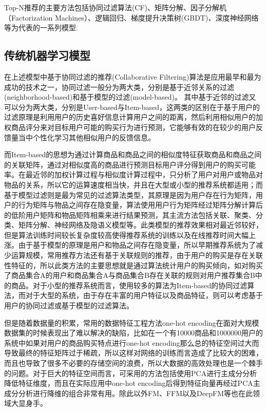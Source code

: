 Top-N推荐的主要方法包括协同过滤算法(CF)、矩阵分解、因子分解机（Factorization Machines）、逻辑回归、梯度提升决策树(GBDT)、深度神经网络等为代表的一系列模型.

\subsection{传统机器学习模型}

在上述模型中基于协同过滤的推荐(Collaborative Filtering)\cite{su2009survey}算法是应用最早和最为成功的技术之一，协同过滤一般分为两大类，分别是基于近邻关系的过滤(neighborhood-based)和基于模型的过滤(model-based)。
其中基于近邻的过滤又可以分为两大类，分别是User-based与Item-based，这两类的区别在于基于用户的过滤\cite{荣辉桂2014基于用户相似度的协同过滤推荐算法}原理是利用用户的历史喜好信息计算用户之间的距离，然后利用相似用户的加权商品评分来对目标用户可能的购买行为进行预测，它能够有效的在较少的用户反馈量当中个性化学习其他相似用户的反馈信息\cite{姜保庆2014基于社交网络的一种个性化推荐算法}。

而Item-based\cite{deshpande2004item}的思想为通过计算商品和商品之间的相似度特征获取商品和商品之间的关联矩阵，通过对相似度高的商品进行预测目标用户评分得到用户的购买可能率。在最近邻的加权计算过程与相似度计算过程中，只分析了用户对用户或物品对物品的关系，所以它的运算速度相当快，并且在大型或小型的推荐系统都适用；而基于模型过滤则是最为常见的过滤算法类型，其原理是因为用户存在行为矩阵，用户的行为矩阵与物品之间存在隐变量，算法使用用户行为矩阵经过矩阵分解计算后的低阶用户矩阵和物品矩阵相乘来进行结果预测，其主流方法包括关联、聚类、分类、矩阵分解、神经网络及隐语义模型等。此类模型的推荐效果相对最近邻较好，但是算法训练时间较长复杂度较高使得推荐系统的训练以及在线推荐时间大幅上涨。由于基于模型的原理是用户和物品之间存在隐变量，所以早期推荐系统为了减少运算规模，常用推荐方法还有基于关联规则的推荐，由于用户的购买是存在关联性特征的，所以此类方法的主要思想就是通过算法统计用户的购买倾向，如对购买了商品集合A的用户和商品集合A与商品集合B存在关联的规则对用户推荐集合B中的商品。对于小型的推荐系统而言，使用较多的算法为Item-based的协同过滤算法，而对于大型的系统，由于存在丰富的用户特征以及商品特征，则可以考虑基于用户的协同过滤或基于模型的过滤算法。

但是随着数据量的积累，常用的数据特征工程方法one-hot encoding在面对大规模数据集的时候表现出了难以解决的缺陷，比如在一个有10000商品和1000000用户的系统中如果对用户的商品购买特点进行one-hot encoding那么总的特征空间过大而导致最终的特征矩阵过于稀疏，所以这样对网络的训练而言造成了比较大的困难，而且也导致了很多不必要的存储空间的浪费，所以大数据的高效处理也是一个棘手的问题。对于巨大的特征空间而言，可采用的方法包括使用PCA进行主成分分析降低特征维度，而且在实际应用中one-hot encoding后得到特征向量再经过PCA主成分分析进行降维的组合非常有用。除此以外FM、FFM以及DeepFM等也在此领域大显身手。

